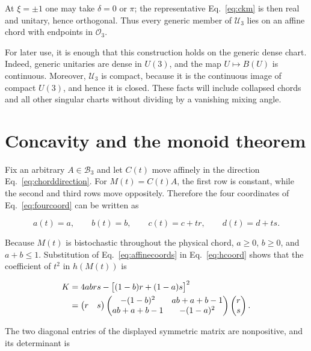 \documentclass[aip,jmp,amsmath,amssymb,preprint,nofootinbib]{revtex4-2}
\newcommand{\Bd}{\mathcal{B}_3}
\newcommand{\Ud}{\mathcal{U}_3}
\newcommand{\Od}{\mathcal{O}_3}
\begin{document}
At $\xi=\pm1$ one may take $\delta=0$ or $\pi$; the representative
Eq.~\eqref{eq:ckm} is then real and unitary, hence orthogonal.  Thus every
generic member of $\Ud$ lies on an affine chord with endpoints in $\Od$.

For later use, it is enough that this construction holds on the generic
dense chart.  Indeed, generic unitaries are dense in $U(3)$, and the map
$U\mapsto B(U)$ is continuous.  Moreover, $\Ud$ is compact, because it is
the continuous image of compact $U(3)$, and hence it is closed.  These facts
will include collapsed chords and all other singular charts without dividing
by a vanishing mixing angle.

\section{Concavity and the monoid theorem}
\label{sec:main}

Fix an arbitrary $A\in\Bd$ and let $C(t)$ move affinely in the direction
Eq.~\eqref{eq:chorddirection}.  For $M(t)=C(t)A$, the first row is constant,
while the second and third rows move oppositely.  Therefore the four
coordinates of Eq.~\eqref{eq:fourcoord} can be written as

\begin{equation}
 a(t)=a,\qquad b(t)=b,\qquad
 c(t)=c+tr,\qquad d(t)=d+ts.                       \label{eq:affinecoords}
\end{equation}

Because $M(t)$ is bistochastic throughout the physical chord,
$a\geq0$, $b\geq0$, and $a+b\leq1$.  Substitution of
Eq.~\eqref{eq:affinecoords} in Eq.~\eqref{eq:hcoord} shows that the
coefficient of $t^2$ in $h(M(t))$ is

\begin{align}
 K
 &=4abrs-\bigl[(1-b)r+(1-a)s\bigr]^2\notag\\
 &=\begin{pmatrix}r&s\end{pmatrix}
 \begin{pmatrix}
 -(1-b)^2&ab+a+b-1\\
 ab+a+b-1&-(1-a)^2
 \end{pmatrix}
 \begin{pmatrix}r\\s\end{pmatrix}.              \label{eq:K}
\end{align}

The two diagonal entries of the displayed symmetric matrix are
nonpositive, and its determinant is
\end{document}
